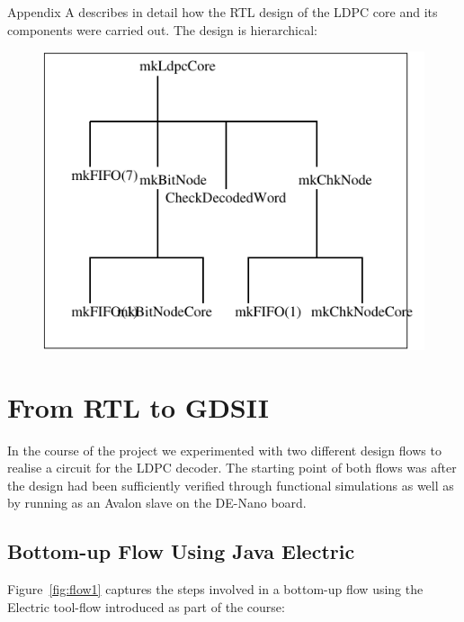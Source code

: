 \documentclass[11pt, a4paper]{article}
\begin{document}
Appendix A describes in detail how the RTL design of the LDPC core and its
components were carried out. The design is hierarchical:

\begin{figure}[hbt]
\includegraphics{des-hier.pdf}
\label{fig:dh}
\end{figure}

\section{From RTL to GDSII}
In the course of the project we experimented with two different design flows
to realise a circuit for the LDPC decoder. The starting point of both flows
was after the design had been sufficiently verified through functional
simulations as well as by running as an Avalon slave on the DE-Nano board.

\subsection{Bottom-up Flow Using Java Electric}

Figure~\ref{fig:flow1} captures the steps involved in a bottom-up flow using
the Electric tool-flow introduced as part of the course:
\end{document}
